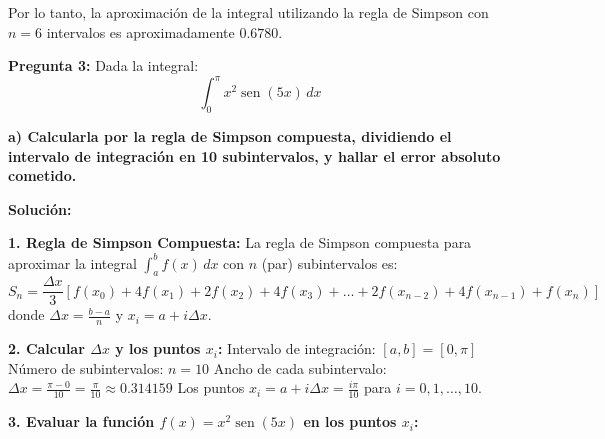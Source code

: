 \documentclass[12pt]{article}
\begin{document}
Por lo tanto, la aproximación de la integral utilizando la regla de Simpson con $n = 6$ intervalos es aproximadamente $0.6780$.

\textbf{Pregunta 3:}  Dada la integral:
\[
\int_{0}^{\pi} x^2 \operatorname{sen}(5x) \, dx
\]

\textbf{a) Calcularla por la regla de Simpson compuesta, dividiendo el intervalo de integración en 10 subintervalos, y hallar el error absoluto cometido.}

\textbf{Solución:}

\textbf{1. Regla de Simpson Compuesta:}
La regla de Simpson compuesta para aproximar la integral $\int_{a}^{b} f(x) \, dx$ con $n$ (par) subintervalos es:
$$S_n = \frac{\Delta x}{3} \left[ f(x_0) + 4f(x_1) + 2f(x_2) + 4f(x_3) + \dots + 2f(x_{n-2}) + 4f(x_{n-1}) + f(x_n) \right]$$
donde $\Delta x = \frac{b - a}{n}$ y $x_i = a + i\Delta x$.

\textbf{2. Calcular $\Delta x$ y los puntos $x_i$:}
Intervalo de integración: $[a, b] = [0, \pi]$
Número de subintervalos: $n = 10$
Ancho de cada subintervalo: $\Delta x = \frac{\pi - 0}{10} = \frac{\pi}{10} \approx 0.314159$
Los puntos $x_i = a + i\Delta x = \frac{i\pi}{10}$ para $i = 0, 1, \dots, 10$.

\textbf{3. Evaluar la función $f(x) = x^2 \operatorname{sen}(5x)$ en los puntos $x_i$:}
\end{document}
